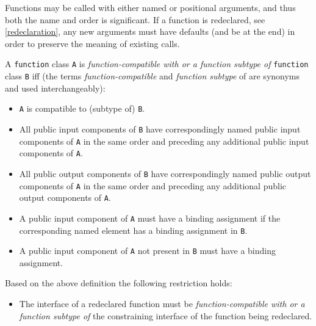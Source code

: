 \begin{nonnormative}
Functions may be called with either named or positional
arguments, and thus both the name and order is significant. If a
function is redeclared, see \cref{redeclaration}, any new arguments must
have defaults (and be at the end) in order to preserve the meaning of
existing calls.
\end{nonnormative}

\begin{definition}
A \lstinline!function! class \lstinline!A! is \emph{function-compatible with or a function subtype of} \lstinline!function! class \lstinline!B! iff (the terms \emph{function-compatible} and \emph{function subtype} of are synonyms and used interchangeably):
\begin{itemize}
\item
  \lstinline!A! is compatible to (subtype of) \lstinline!B!.
\item
  All public input components of \lstinline!B! have correspondingly named public
  input components of \lstinline!A! in the same order and preceding any additional
  public input components of \lstinline!A!.
\item
  All public output components of \lstinline!B! have correspondingly named public
  output components of \lstinline!A! in the same order and preceding any additional
  public output components of \lstinline!A!.
\item
  A public input component of \lstinline!A! must have a binding assignment if the
  corresponding named element has a binding assignment in \lstinline!B!.
\item
  A public input component of \lstinline!A! not present in \lstinline!B! must have a binding
  assignment.
\end{itemize}
\end{definition}

Based on the above definition the following restriction holds:
\begin{itemize}
\item
  The interface of a redeclared function must be
  \emph{function-compatible with or a function subtype of} the
  constraining interface of the function being redeclared.
\end{itemize}

